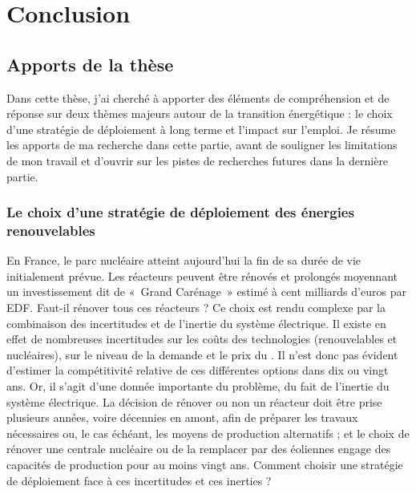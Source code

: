 \chapter{Conclusion} \label{chap:conclusion}

\section{Apports de la thèse} \label{sec:apports}

Dans cette thèse, j’ai cherché à apporter des éléments de compréhension et de réponse sur deux thèmes majeurs autour de la transition énergétique : le choix d’une stratégie de déploiement à long terme et l'impact sur l’emploi. 
Je résume les apports de ma recherche dans cette partie, avant de souligner les limitations de mon travail et d'ouvrir sur les pistes de recherches futures dans la dernière partie.

\subsection{Le choix d'une stratégie de déploiement des énergies renouvelables}

En France, le parc nucléaire atteint aujourd'hui la fin de sa durée de vie initialement prévue. Les réacteurs peuvent être rénovés et prolongés moyennant un investissement dit de «~Grand Carénage~» estimé à cent milliards d'euros par EDF. Faut-il rénover tous ces réacteurs ? Ce choix est rendu complexe par la combinaison des incertitudes et de l'inertie du système électrique.
Il existe en effet de nombreuses incertitudes sur les coûts des technologies (renouvelables et nucléaires), sur le niveau de la demande et le prix du \coo. Il n'est donc pas évident d'estimer la compétitivité relative de ces différentes options dans dix ou vingt ans. Or, il s'agit d'une donnée importante du problème, du fait de l'inertie du système électrique.
La décision de rénover ou non un réacteur doit être prise plusieurs années, voire décennies en amont, afin de préparer les travaux nécessaires ou, le cas échéant, les moyens de production alternatifs ; et le choix de rénover une centrale nucléaire ou de la remplacer par des éoliennes engage des capacités de production pour au moins vingt ans.
Comment choisir une stratégie de déploiement face à ces incertitudes et ces inerties ?

